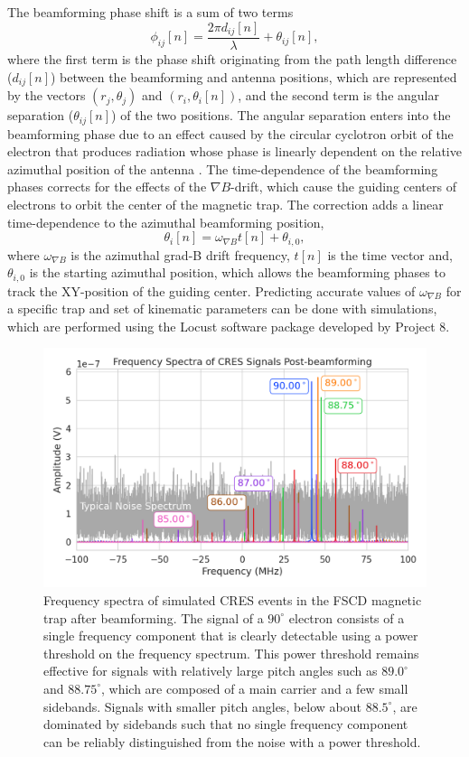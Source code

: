 The beamforming phase shift is a sum of two terms
\begin{equation}
    \phi_{ij}[n]=\frac{2\pi d_{ij}[n]}{\lambda}+\theta_{ij}[n],
\end{equation}
where the first term is the phase shift originating from the path length difference ($d_{ij}[n]$) between the beamforming and antenna positions, which are represented by the vectors $(r_j,\theta_j)$ and $(r_i,\theta_i[n])$, and the second term is the angular separation ($\theta_{ij}[n]$) of the two positions. The angular separation enters into the beamforming phase due to an effect caused by the circular cyclotron orbit of the electron that produces radiation whose phase is linearly dependent on the relative azimuthal position of the antenna \cite{nb_thesis, p8synca}. The time-dependence of the beamforming phases corrects for the effects of the $\nabla B$-drift, which cause the guiding centers of electrons to orbit the center of the magnetic trap. The correction adds a linear time-dependence to the azimuthal beamforming position,
\begin{equation}
    \theta_{i}[n]=\omega_{\nabla B}t[n]+\theta_{i,0},
\end{equation}
where $\omega_{\nabla B}$ is the azimuthal grad-B drift frequency, $t[n]$ is the time vector and, $\theta_{i,0}$ is the starting azimuthal position, which allows the beamforming phases to track the XY-position of the guiding center. Predicting accurate values of $\omega_{\nabla B}$ for a specific trap and set of kinematic parameters can be done with simulations, which are performed using the Locust software package \cite{p8locustpaper} developed by Project 8.

\begin{figure}[ht]
    \centering
    \includegraphics[width=.7\textwidth]{figs/Chapter-4/230313_cres_signal_post_bf_examples.png}
    \caption{Frequency spectra of simulated CRES events in the FSCD magnetic trap after beamforming. The signal of a $90^\circ$ electron consists of a single frequency component that is clearly detectable using a power threshold on the frequency spectrum. This power threshold remains effective for signals with relatively large pitch angles such as $89.0^\circ$ and $88.75^\circ$, which are composed of a main carrier and a few small sidebands. Signals with smaller pitch angles, below about $88.5^\circ$, are dominated by sidebands such that no single frequency component can be reliably distinguished from the noise with a power threshold.
    }
    \label{fig:signal_post_bf_example}
\end{figure}

